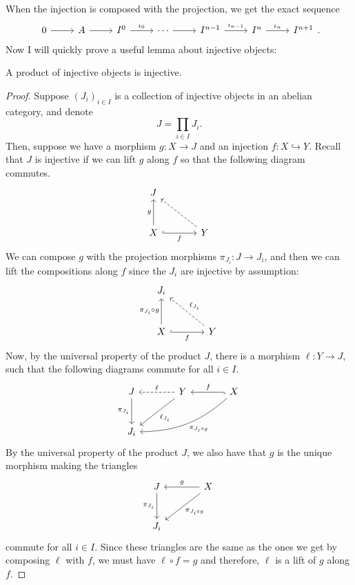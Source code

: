 When the injection is composed with the projection, we get the exact sequence
\[\begin{tikzcd}
    0\rar & A\rar & I^{0}\rar{\iota_{0}} & \cdots\rar
    & I^{n-1}\rar{\iota_{n-1}} & I^{n}\rar{\iota_{n}} & I^{n+1}
  \end{tikzcd}.\]
Now I will quickly prove a useful lemma about injective objects:
\begin{lemm}\label{lemm:product_injectives}
  A product of injective objects is injective.
\end{lemm}
\begin{proof}
  Suppose $(J_{i})_{i\in I}$ is a collection of injective objects in an
  abelian category, and denote
  \[
    J=\prod_{i\in I} J_{i}.
  \]
  Then, suppose we have a morphism $g: X\to J$ and an injection
  $f:X\hookrightarrow Y$. Recall that $J$ is injective if we can lift $g$
  along $f$ so that the following diagram commutes.
  \[\begin{tikzcd}[row sep=large, column sep=large]
      J & \\ X\uar{g}\arrow[r, hook, "f"'] & Y\ular[dashed]
    \end{tikzcd}\]
  We can compose $g$ with the projection morphisms
  $\pi_{J_{i}}:J\to J_{i}$, and then we can lift the compositions along $f$
  since the $J_{i}$ are injective by assumption:
  \[\begin{tikzcd}[row sep=large, column sep=large]
        J_{i} & \\ X\uar{\pi_{J_{i}}\circ g}\arrow[r, hook, "f"']
        & Y\arrow[ul, dashed, "\ell_{J_{i}}"']
    \end{tikzcd}\]
  Now, by the universal property of the product $J$, there is a morphism
  $\ell: Y\to J$, such that the following diagrams commute for all $i\in I$.
  \[\begin{tikzcd}[row sep=large, column sep=large]
      J\arrow[d, "\pi_{J_{i}}"'] & Y\arrow[l, dashed, "\ell"']
      \dlar{\ell_{J_{i}}} & X\arrow[l, hook, "f"']
      \arrow[dll, bend left=20, "\pi_{J_{i}\circ g}"] \\ J_{i} &&
    \end{tikzcd}\]
  By the universal property of the product $J$, we also have that $g$ is the
  unique morphism making the triangles
  \[\begin{tikzcd}[row sep = large, column sep=large]
      J\arrow[d, "\pi_{J_{i}}"'] & X\arrow[l, "g"']\dlar{\pi_{J_{i}\circ g}} \\
      J_{i} &
    \end{tikzcd}\]
  commute for all $i\in I$. Since these triangles are the same as the ones
  we get by composing $\ell$ with $f$, we must have $\ell\circ f=g$
  and therefore, $\ell$ is a lift of $g$ along $f$.
\end{proof}
